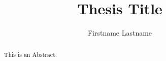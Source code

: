 \documentclass[english,ba]{tudo-thesis}
\title{Thesis Title}
\author{Firstname Lastname}
\begin{document}
\maketitle


\begin{abstract}
  This is an Abstract. \blindtext
\end{abstract}


\tableofcontents
\cleardoublepage










\end{document}
